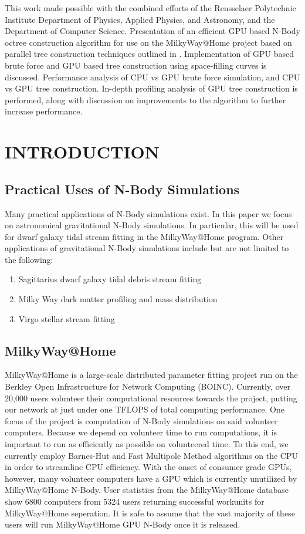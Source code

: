 \documentclass{thesis}
\begin{document}
This work made possible with the combined efforts of the Rensselaer Polytechnic Institute Department of Physics, Applied Physics, and Astronomy, and the Department of Computer Science.
Presentation of an efficient GPU based N-Body octree construction algorithm for use on the MilkyWay@Home project based on parallel tree construction techniques outlined in \cite{Karras:2012}. Implementation of GPU based brute force and GPU based tree construction using space-filling curves is discussed. Performance analysis of CPU vs GPU brute force simulation, and CPU vs GPU tree construction. In-depth profiling analysis of GPU tree construction is performed, along with discussion on improvements to the algorithm to further increase performance.
\chapter{INTRODUCTION}
\section{Practical Uses of N-Body Simulations}
Many practical applications of N-Body simulations exist. In this paper we focus on astronomical gravitational N-Body simulations. In particular, this will be used for dwarf galaxy tidal stream fitting in the MilkyWay@Home program. Other applications of gravitational N-Body simulations include but are not limited to the following:
\begin{enumerate}
    \item Sagittarius dwarf galaxy tidal debris stream fitting \citep{Law2005,Law2010}
    \item Milky Way dark matter profiling and mass distribution \citep{Sanderson2017}
    \item Virgo stellar stream fitting \citep{CarlinVirgo}
\end{enumerate}
\section{MilkyWay@Home}
MilkyWay@Home is a large-scale distributed parameter fitting project run on the Berkley Open Infrastructure for Network Computing (BOINC). Currently, over 20,000 users volunteer their computational resources towards the project, putting our network at just under one TFLOPS of total computing performance.  One focus of the project is computation of N-Body simulations on said volunteer computers. Because we depend on volunteer time to run computations, it is important to run as efficiently as possible on volunteered time. To this end, we currently employ Barnes-Hut and Fast Multipole Method algorithms on the CPU in order to streamline CPU efficiency. With the onset of consumer grade GPUs, however, many volunteer computers have a GPU which is currently unutilized by MilkyWay@Home N-Body. User statistics from the MilkyWay@Home database show 6800 computers from 5324 users returning successful workunits for MilkyWay@Home seperation. It is safe to assume that the vast majority of these users will run MilkyWay@Home GPU N-Body once it is released.
\end{document}
